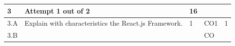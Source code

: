 \documentclass[12pt]{article}
\begin{document}
	
	


	
	
		

	
	
	\begin{tabular}{|L{1cm}|L{8cm}|C{1cm}|C{1cm}|C{1cm}|}\hline
			\bf3 & \bf{Attempt} \bf1 out of \bf2 & \bf16 & & \\ \hline
				3.A &
	Explain with characteristics the React.js Framework. \newline
		 &  1 & CO1 & 1\\ \hline
		3.B &
	 \newline
		 &   & CO & \\ \hline
		\end{tabular}

	
	


	
	
		
	
\end{document}
